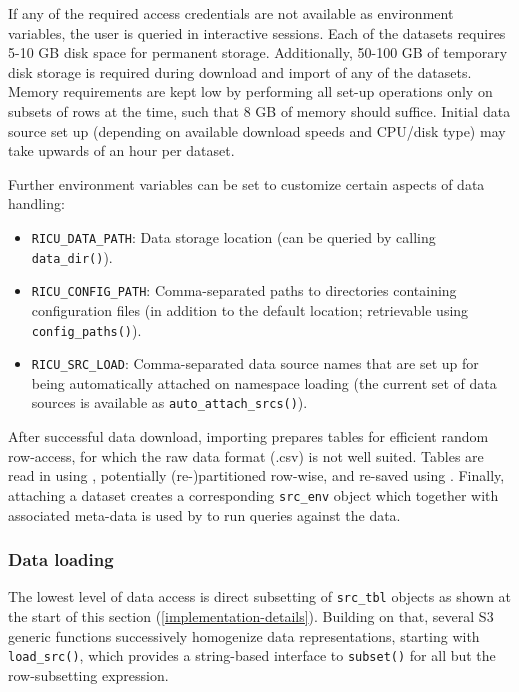 \documentclass[
  notitle]{jss}
\providecommand{\tightlist}{%
  \setlength{\itemsep}{0pt}\setlength{\parskip}{0pt}}
\begin{document}
If any of the required access credentials are not available as
environment variables, the user is queried in interactive sessions. Each
of the datasets requires 5-10 GB disk space for permanent storage.
Additionally, 50-100 GB of temporary disk storage is required during
download and import of any of the datasets. Memory requirements are kept
low by performing all set-up operations only on subsets of rows at the
time, such that 8 GB of memory should suffice. Initial data source set
up (depending on available download speeds and CPU/disk type) may take
upwards of an hour per dataset.

Further environment variables can be set to customize certain aspects of
 data handling:

\begin{itemize}
\tightlist
\item
  \texttt{RICU\_DATA\_PATH}: Data storage location (can be queried by
  calling \texttt{data\_dir()}).
\item
  \texttt{RICU\_CONFIG\_PATH}: Comma-separated paths to directories
  containing configuration files (in addition to the default location;
  retrievable using \texttt{config\_paths()}).
\item
  \texttt{RICU\_SRC\_LOAD}: Comma-separated data source names that are
  set up for being automatically attached on namespace loading (the
  current set of data sources is available as
  \texttt{auto\_attach\_srcs()}).
\end{itemize}

After successful data download, importing prepares tables for efficient
random row-access, for which the raw data format (.csv) is not well
suited. Tables are read in using  \citep{hester2020},
potentially (re-)partitioned row-wise, and re-saved using .
Finally, attaching a dataset creates a corresponding \texttt{src\_env}
object which together with associated meta-data is used by  to
run queries against the data.

\hypertarget{data-loading}{%
\subsubsection{Data loading}\label{data-loading}}

The lowest level of data access is direct subsetting of
\texttt{src\_tbl} objects as shown at the start of this section
(\ref{implementation-details}). Building on that, several S3 generic
functions successively homogenize data representations, starting with
\texttt{load\_src()}, which provides a string-based interface to
\texttt{subset()} for all but the row-subsetting expression.
\end{document}
